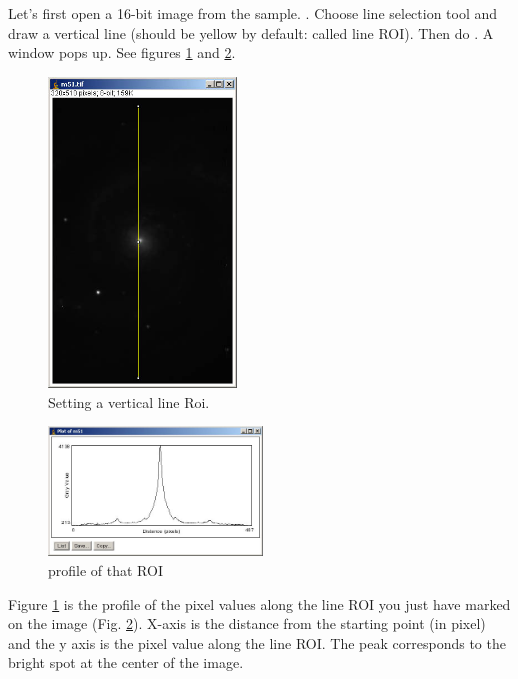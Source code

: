 \begin{indentexercise}{1}
Let's first open a 16-bit image from the sample. 
. Choose line selection tool and draw a vertical line 
(should be yellow by default: called line ROI). Then do . 
A window pops up. See figures \ref{fig:img6} and \ref{fig:img7}.

\begin{figure}[htbp]
\begin{center}
\includegraphics[width=5cm]{fig/CMCIBasicCourse201102-img6.jpg}
\caption{Setting a vertical line Roi.}
\label{fig:img6}
\end{center}
\end{figure}

\begin{figure}[htbp]
\begin{center}
\includegraphics[width=5.694cm,height=3.44cm]{fig/CMCIBasicCourse201102-img7.jpg}
\caption{profile of that ROI}
\label{fig:img7}
\end{center}
\end{figure}

Figure \ref{fig:img6} is the profile of the pixel values along the line ROI 
you just have marked on the image (Fig. \ref{fig:img7}). X-axis is the distance 
from the starting point (in pixel) and the y axis is the pixel value along the line ROI. 
The peak corresponds to the bright spot at the center of the image. 


\end{indentexercise}
